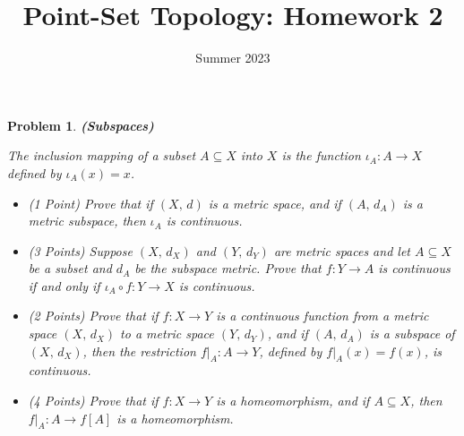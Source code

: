 \documentclass{article}
\title{Point-Set Topology: Homework 2}
\date{Summer 2023}
\theoremstyle{normal}
\newtheorem{problem}{Problem}
\begin{document}
    \maketitle
    \color{blue}
    \begin{problem}
        \textbf{(Subspaces)}
        \par\hfill\par
        The inclusion mapping of a subset $A\subseteq{X}$ into $X$ is the
        function $\iota_{A}:A\rightarrow{X}$ defined by $\iota_{A}(x)=x$.
        \begin{itemize}
            \item (1 Point) Prove that if $(X,\,d)$ is a metric space, and if
                $(A,\,d_{A})$ is a metric subspace, then $\iota_{A}$ is
                continuous.
            \item (3 Points) Suppose $(X,\,d_{X})$ and $(Y,\,d_{Y})$ are
                metric spaces and let $A\subseteq{X}$ be a subset and
                $d_{A}$ be the subspace metric. Prove that $f:Y\rightarrow{A}$
                is continuous \textit{if and only if}
                $\iota_{A}\circ{f}:Y\rightarrow{X}$ is continuous.
            \item (2 Points)
                Prove that if $f:X\rightarrow{Y}$ is a continuous function
                from a metric space $(X,\,d_{X})$ to a metric space
                $(Y,\,d_{Y})$, and if $(A,\,d_{A})$ is a subspace of
                $(X,\,d_{X})$, then the restriction $f|_{A}:A\rightarrow{Y}$,
                defined by $f|_{A}(x)=f(x)$, is continuous.
            \item (4 Points) Prove that if $f:X\rightarrow{Y}$ is a
                homeomorphism, and if $A\subseteq{X}$, then
                $f|_{A}:A\rightarrow{f}[A]$ is a homeomorphism.
        \end{itemize}
    \end{problem}
    \color{black}
\end{document}
